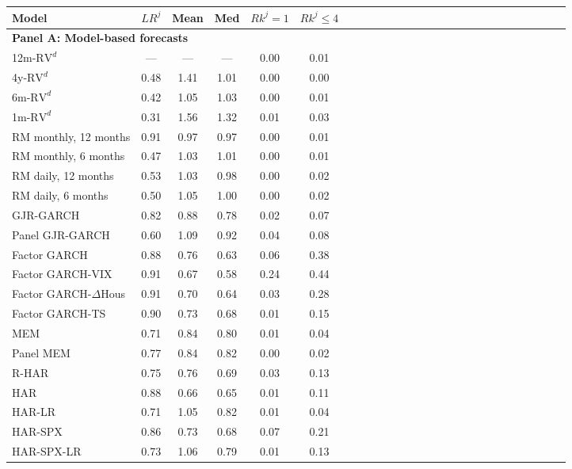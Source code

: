 \begin{tabular}{llccccccccccccccccccccccccc} 
\toprule 
Model & & $LR^j$ & Mean & Med & $Rk^j = 1$ & $Rk^j \leq 4$ \\\midrule 
\multicolumn{4}{l}{\textbf{Panel A: Model-based forecasts}} \\ \midrule 
\multicolumn{2}{l}{12m-$\text{RV}^d$} & --- & --- & --- & 0.00 & 0.01\\ 
\multicolumn{2}{l}{4y-$\text{RV}^d$} & 0.48 & 1.41 & 1.01 & 0.00 & 0.00\\ 
\multicolumn{2}{l}{6m-$\text{RV}^d$} & 0.42 & 1.05 & 1.03 & 0.00 & 0.01\\ 
\multicolumn{2}{l}{1m-$\text{RV}^d$} & 0.31 & 1.56 & 1.32 & 0.01 & 0.03\\ 
\midrule 
\multicolumn{2}{l}{RM monthly, 12 months} & 0.91 & 0.97 & 0.97 & 0.00 & 0.01\\ 
\multicolumn{2}{l}{RM monthly, 6 months} & 0.47 & 1.03 & 1.01 & 0.00 & 0.01\\ 
\multicolumn{2}{l}{RM daily, 12 months} & 0.53 & 1.03 & 0.98 & 0.00 & 0.02\\ 
\multicolumn{2}{l}{RM daily, 6 months} & 0.50 & 1.05 & 1.00 & 0.00 & 0.02\\ 
\midrule 
\multicolumn{2}{l}{GJR-GARCH} & 0.82 & 0.88 & 0.78 & 0.02 & 0.07\\ 
\multicolumn{2}{l}{Panel GJR-GARCH} & 0.60 & 1.09 & 0.92 & 0.04 & 0.08\\ 
\multicolumn{2}{l}{Factor GARCH} & 0.88 & 0.76 & 0.63 & 0.06 & 0.38\\ 
\multicolumn{2}{l}{Factor GARCH-VIX} & 0.91 & 0.67 & 0.58 & 0.24 & 0.44\\ 
\multicolumn{2}{l}{Factor GARCH-$\Delta$Hous} & 0.91 & 0.70 & 0.64 & 0.03 & 0.28\\ 
\multicolumn{2}{l}{Factor GARCH-TS} & 0.90 & 0.73 & 0.68 & 0.01 & 0.15\\ 
\multicolumn{2}{l}{MEM} & 0.71 & 0.84 & 0.80 & 0.01 & 0.04\\ 
\multicolumn{2}{l}{Panel MEM} & 0.77 & 0.84 & 0.82 & 0.00 & 0.02\\ 
\midrule 
\multicolumn{2}{l}{R-HAR} & 0.75 & 0.76 & 0.69 & 0.03 & 0.13\\ 
\multicolumn{2}{l}{HAR} & 0.88 & 0.66 & 0.65 & 0.01 & 0.11\\ 
\multicolumn{2}{l}{HAR-LR} & 0.71 & 1.05 & 0.82 & 0.01 & 0.04\\ 
\multicolumn{2}{l}{HAR-SPX} & 0.86 & 0.73 & 0.68 & 0.07 & 0.21\\ 
\multicolumn{2}{l}{HAR-SPX-LR} & 0.73 & 1.06 & 0.79 & 0.01 & 0.13\\ 

\end{tabular}

